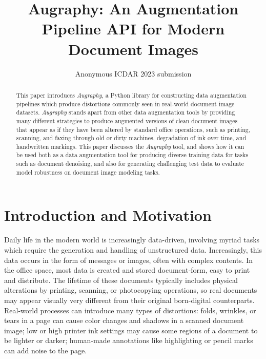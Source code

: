 \documentclass[runningheads]{llncs}
\begin{document}
\title{Augraphy: An Augmentation Pipeline API for Modern Document Images}
%
%

\author{Anonymous ICDAR 2023 submission}

\maketitle

\begin{abstract}
This paper introduces \emph{Augraphy}, a Python library for constructing data augmentation pipelines which produce distortions commonly seen in real-world document image datasets.
\emph{Augraphy} stands apart from other data augmentation tools by providing many different strategies to produce augmented versions of clean document images that appear as if they have been altered by standard office operations, such as printing, scanning, and faxing through old or dirty machines, degradation of ink over time, and handwritten markings.
This paper discusses the \emph{Augraphy} tool, and shows how it can be used both as a data augmentation tool for producing diverse training data for tasks such as document denoising, and also for generating challenging test data to evaluate model robustness on document image modeling tasks.

\end{abstract}

\section{Introduction and Motivation}
Daily life in the modern world is increasingly data-driven, involving myriad tasks which require the generation and handling of unstructured data.
Increasingly, this data occurs in the form of messages or images, often with complex contents.
In the office space, most data is created and stored document-form, easy to print and distribute.
The lifetime of these documents typically includes physical alterations by printing, scanning, or photocopying operations, so real documents may appear visually very different from their original born-digital counterparts.
Real-world processes can introduce many types of distortions: folds, wrinkles, or tears in a page can cause color changes and shadows in a scanned document image; low or high printer ink settings may cause some regions of a document to be lighter or darker; human-made annotations like highlighting or pencil marks can add noise to the page.
\end{document}
